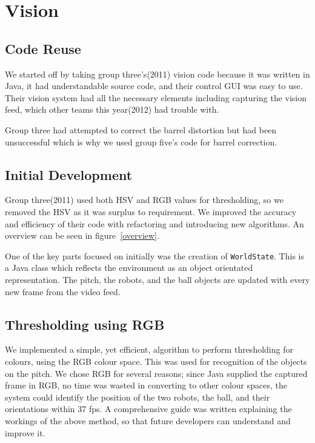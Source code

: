 \section{Vision}

\subsection{Code Reuse}

We started off by taking group three's(2011) vision code because it was written
in Java, it had understandable source code, and their control GUI was easy to
use. Their vision system had all the necessary elements including capturing the
vision feed, which other teams this year(2012) had trouble with.  

Group three had attempted to correct the barrel distortion but had been
unsuccessful which is why we used group five's code for barrel correction.

\subsection{Initial Development}

Group three(2011) used both HSV and RGB values for thresholding, so we removed
the HSV as it was surplus to requirement. We improved the accuracy and
efficiency of their code with refactoring and introducing new algorithms. An
overview can be seen in figure~\ref{overview}.

One of the key parts focused on initially was the creation of
\texttt{WorldState}. This is a Java class which reflects the environment as an
object orientated representation. The pitch, the robots, and the ball objects
are updated with every new frame from the video feed.

\subsection{Thresholding using RGB} \label{sec:thresh}

We implemented a simple, yet efficient, algorithm to perform thresholding
for colours, using the RGB colour space. This was used for recognition
of the objects on the pitch. We chose RGB for several reasons; since Java
supplied the captured frame in RGB, no time was wasted in converting to other
colour spaces, the system could identify the position of the two robots, the
ball, and their orientations within 37 fps. A comprehensive guide was written
explaining the workings of the above method, so that future developers can understand
and improve it.

